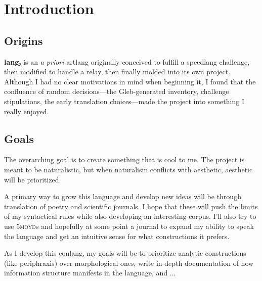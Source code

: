\documentclass[fontsize=12pt,twoside=false,numbers=noenddot]{kaobook}
\title[A Grammar of \langname{}]{\huge \langname{}}
\subtitle{grammar of a constructed language}
\author[kilenc]{\large Seth Thompson \\ \small \textit{aka} kilenc}
\date{\small \today}
\newcommand{\langname}{\textbf{lang₂}}
\newcommand{\tsc}[1]{\textsc{#1}}
\begin{document}
\frontmatter

\maketitle
{}

\setlength{\textheight}{23cm} %
\etocstandarddisplaystyle %
\etocstandardlines %
\tableofcontents 


\setchapterpreamble[u]{\margintoc}
\chapter{Introduction}
\section{Origins}
\langname{} is an \emph{a priori} artlang originally conceived to fulfill a speedlang challenge, then modified to handle a relay, then finally molded into its own project. Although I had no clear motivations in mind when beginning it, I found that the confluence of random decisions---the Gleb-generated inventory, challenge stipulations, the early translation choices---made the project into something I really enjoyed.

\section{Goals}
The overarching goal is to create something that is cool to me. The project is meant to be naturalistic, but when naturalism conflicts with aesthetic, aesthetic will be prioritized.

A primary way to grow this language and develop new ideas will be through translation of poetry and scientific journals. I hope that these will push the limits of my syntactical rules while also developing an interesting corpus. I'll also try to use \tsc{5moyd}s and hopefully at some point a journal to expand my ability to speak the language and get an intuitive sense for what constructions it prefers.

As I develop this conlang, my goals will be to prioritize analytic constructions (like periphraxis) over morphological ones, write in-depth documentation of how information structure manifests in the language, and ...
\end{document}
